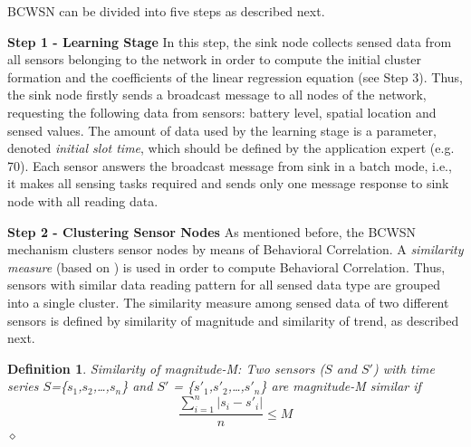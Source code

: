 \documentclass{acm_proc_article-sp}
\newcommand{\dia}{\hspace*{.1cm} \hfill $\diamond$}
\begin{document}
BCWSN can be divided into five steps as described next.
\vspace*{-.3cm}

{\bf Step 1 - Learning Stage}
In this step, the sink node collects sensed data from all sensors belonging to
the network in order to compute the initial cluster formation and the
coefficients of the linear regression equation (see Step 3). Thus, the sink 
node firstly sends a broadcast message to all
nodes of the network, requesting the following data from sensors:
battery level, spatial location and sensed values. The amount of data used by the
learning stage is a parameter, denoted \textit{initial slot time}, which should be
defined by the application expert (e.g. 70). Each sensor answers the broadcast
message from sink in a batch mode, i.e., it makes all sensing tasks required and
sends only one message response to sink node with all reading data.
\vspace*{-.3cm}

{\bf Step 2 - Clustering Sensor Nodes}
As mentioned before, the BCWSN mechanism clusters sensor nodes by means of
Behavioral Correlation. A \textit{similarity measure} (based on \cite{Liu2007})
is used in order to compute Behavioral Correlation. Thus, sensors with similar
data reading pattern for all sensed data type are grouped into a single cluster.
The similarity measure among sensed data of two different sensors is defined by
similarity of magnitude and similarity of trend, as described next.
\vspace*{-.3cm}

\newtheorem{defini}{Definition}

\begin{defini}
Similarity of magnitude-M: Two sensors ($S$ and $S'$) with time series
$S$=\{$s_{1}$,$s_{2}$,\ldots,$s_{n}$\} and
$S'$ = \{$s'_{1}$,$s'_{2}$,\ldots,$s'_{n}$\} are magnitude-M similar if 
\begin{equation}
\label{equ:magni}
\frac{\sum_{i=1}^{n} |s_{i}-s'_{i}|}{n} \leq M
\end{equation}
\dia
\end{defini}
\vspace*{-.9cm}
\end{document}
